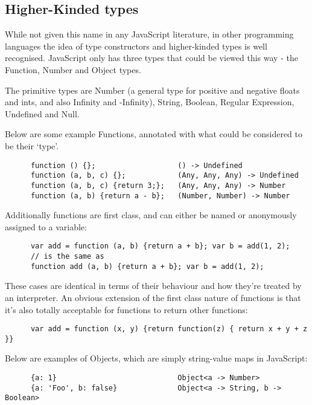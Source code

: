 \documentclass[british, twoside]{bhamthesis}
\theoremstyle{definition}
\begin{document}
  \subsection{Higher-Kinded types}
    While not given this name in any JavaScript literature, in other programming languages the idea of type constructors and higher-kinded types is well recognised. JavaScript only has three types that could be viewed this way - the Function, Number and Object types.

    The primitive types are Number (a general type for positive and negative floats and ints, and also Infinity and -Infinity), String, Boolean, Regular Expression, Undefined and Null.

    Below are some example Functions, annotated with what could be considered to be their `type'.

    \begin{lstlisting}
      function () {};                   () -> Undefined
      function (a, b, c) {};            (Any, Any, Any) -> Undefined
      function (a, b, c) {return 3;};   (Any, Any, Any) -> Number
      function (a, b) {return a - b};   (Number, Number) -> Number
    \end{lstlisting}

    Additionally functions are first class, and can either be named or anonymously assigned to a variable:

    \begin{lstlisting}
      var add = function (a, b) {return a + b}; var b = add(1, 2);
      // is the same as
      function add (a, b) {return a + b}; var b = add(1, 2);
    \end{lstlisting}

    These cases are identical in terms of their behaviour and how they're treated by an interpreter. An obvious extension of the first class nature of functions is that it's also totally acceptable for functions to return other functions:

    \begin{lstlisting}
      var add = function (x, y) {return function(z) { return x + y + z }}
    \end{lstlisting}

    Below are examples of Objects, which are simply string-value maps in JavaScript:

    \begin{lstlisting}
      {a: 1}                            Object<a -> Number>
      {a: 'Foo', b: false}              Object<a -> String, b -> Boolean>
    \end{lstlisting}
\end{document}

